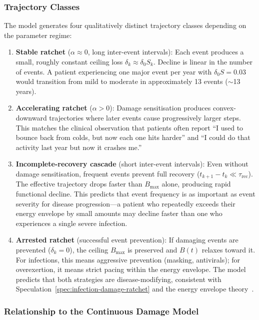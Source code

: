 \subsubsection{Trajectory Classes}

The model generates four qualitatively distinct trajectory classes depending on the parameter regime:

\begin{enumerate}
\item
\textbf{Stable ratchet} ($\alpha \approx 0$, long inter-event intervals): Each event produces a small, roughly constant ceiling loss $\delta_k \approx \delta_0 S_k$. Decline is linear in the number of events. A patient experiencing one major event per year with $\delta_0 S = 0.03$ would transition from mild to moderate in approximately 13 events ($\sim$13 years).

\item
\textbf{Accelerating ratchet} ($\alpha > 0$): Damage sensitisation produces convex-downward trajectories where later events cause progressively larger steps. This matches the clinical observation that patients often report ``I used to bounce back from colds, but now each one hits harder'' and ``I could do that activity last year but now it crashes me.''

\item
\textbf{Incomplete-recovery cascade} (short inter-event intervals): Even without damage sensitisation, frequent events prevent full recovery ($t_{k+1} - t_k \ll \tau_{\text{rec}}$). The effective trajectory drops faster than $B_{\max}$ alone, producing rapid functional decline. This predicts that event frequency is as important as event severity for disease progression---a patient who repeatedly exceeds their energy envelope by small amounts may decline faster than one who experiences a single severe infection.

\item
\textbf{Arrested ratchet} (successful event prevention): If damaging events are prevented ($\delta_k = 0$), the ceiling $B_{\max}$ is preserved and $B(t)$ relaxes toward it. For infections, this means aggressive prevention (masking, antivirals); for overexertion, it means strict pacing within the energy envelope. The model predicts that both strategies are disease-modifying, consistent with Speculation~\ref{spec:infection-damage-ratchet} and the energy envelope theory~\cite{jason2012energy}.
\end{enumerate}

\subsubsection{Relationship to the Continuous Damage Model}

